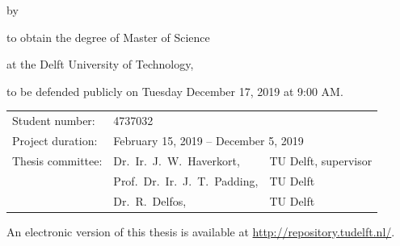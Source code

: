 \begin{titlepage}


\begin{center}


{\makeatletter
\largetitlestyle\fontsize{36}{36}\selectfont\@title
\makeatother}

{\makeatletter
\ifx\@subtitle\undefined\else
    \bigskip
   {\tudsffamily\fontsize{32}{32}\selectfont\@subtitle}    
\fi
\makeatother}

\bigskip
\bigskip
\bigskip
\bigskip

by

\bigskip
\bigskip
\bigskip
\bigskip

{\makeatletter
\largetitlestyle\fontsize{24}{24}\selectfont\@author
\makeatother}

\bigskip
\bigskip
\bigskip
\bigskip

to obtain the degree of Master of Science

at the Delft University of Technology,

to be defended publicly on Tuesday December 17, 2019 at 9:00 AM.

\vfill

\begin{tabular}{lll}
    Student number: & 4737032 \\
    Project duration: & \multicolumn{2}{l}{February 15, 2019 -- December 5, 2019} \\
    Thesis committee: 
    & Dr.\ Ir.\ J.\ W.\ Haverkort, & TU Delft, supervisor \\
    & Prof.\ Dr.\ Ir.\ J.\ T.\  Padding, & TU Delft \\
    & Dr.\ R.\ Delfos, & TU Delft
\end{tabular}

\bigskip
\bigskip

\bigskip
\bigskip
An electronic version of this thesis is available at \url{http://repository.tudelft.nl/}.


\end{center}
\end{titlepage}

